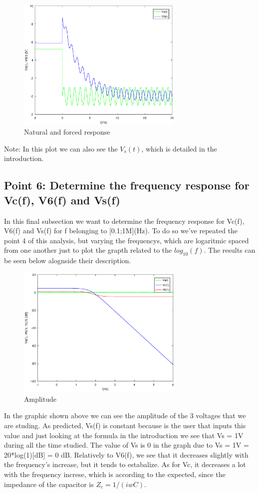 \begin{figure}[H]
\centering
\includegraphics[width = 8cm]{Solution.eps}
\caption {Natural and forced response}
\end{figure}

Note: In this plot we can also see the $V_s(t)$, which is detailed in the introduction.

\subsection{Point 6: Determine the frequency response for Vc(f), V6(f) and Vs(f)}

In this final subsection we want to determine the frequency response for Vc(f), V6(f) and Vs(f) for f belonging to [0.1;1M](Hz). To do so we've repeated the point 4 of this analysis, but varying the frequencys, which are logaritmic spaced from one another just to plot the grapth related to the $log_{10}(f)$. The results can be seen below alognside their description.

\begin{figure}[H]
\centering
\includegraphics[width = 8cm]{Amplitude.eps}
\caption {Amplitude}
\end{figure}

In the graphic shown above we can see the amplitude of the 3 voltages that we are studing. As predicted, Vs(f) is constant because is the user that inputs this value and just looking at the formula in the introduction we see that Vs = 1V during all the time studied. The value of Vs is 0 in the graph due to Vs = 1V = 20*log(1)[dB] = 0 dB. Relatively to V6(f), we see that it decreases slightly with the frequency's increase, but it tends to estabalize. As for Vc, it decreases a lot with the frequency increse, which is according to the expected, since the impedance of the capacitor is $Z_c = 1/(iwC)$.

